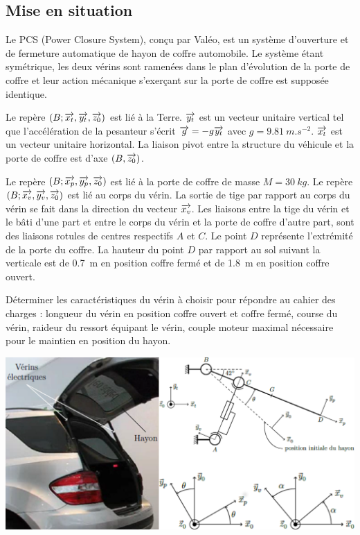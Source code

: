 \documentclass[10pt,fleqn]{article} %
\begin{document}

\vspace{4.5cm}
\pagestyle{fancy}
\thispagestyle{plain}


\def\columnseprulecolor{\color{ocre}}
\setlength{\columnseprule}{0.4pt} 

\ifprof
\begin{multicols}{2}
\else
\begin{multicols}{2}
\fi
\section*{Mise en situation}
Le PCS (Power Closure System), conçu par Valéo, est un système d’ouverture et de fermeture automatique de
hayon de coffre automobile.
Le système étant symétrique, les deux vérins sont ramenées dans 
le plan d’évolution de la porte de coffre et leur action mécanique s’exerçant sur la porte de coffre est supposée identique.

Le repère $\left(B;\overrightarrow{x_t},\overrightarrow{y_t},\overrightarrow{z_0} \right)$ est lié à la Terre. $\overrightarrow{y_t}$ est un vecteur unitaire vertical tel que l’accélération de la pesanteur s’écrit $\overrightarrow{g}=-g\overrightarrow{y_t}$ avec $g=\SI{9,81}{m.s^{-2}}$. $\overrightarrow{x_t}$ est un vecteur unitaire horizontal. La liaison pivot entre
la structure du véhicule et la porte de coffre est d’axe $\left(B,\overrightarrow{z_0}\right)$.

Le repère $\left(B;\overrightarrow{x_p},\overrightarrow{y_p},\overrightarrow{z_0} \right)$ est lié à la porte de coffre de masse $M=\SI{30}{kg}$. Le repère $\left(B;\overrightarrow{x_v},\overrightarrow{y_v},\overrightarrow{z_0} \right)$ est lié au corps du vérin. La sortie
de tige par rapport au corps du vérin se fait dans la direction du vecteur $\overrightarrow{x_v}$.
Les liaisons entre la tige du vérin et le bâti d’une part et entre le corps du vérin et la porte de coffre d’autre part, sont des liaisons rotules de centres respectifs $A$ et $C$.
Le point $D$ représente l’extrémité de la porte du coffre. La hauteur du point $D$ par rapport au sol suivant la
verticale est de \SI{0,7}{m} en position coffre fermé et de \SI{1,8}{m} en position coffre ouvert.

\begin{obj}
Déterminer les caractéristiques du vérin à choisir pour répondre au cahier des charges : longueur
du vérin en position coffre ouvert et coffre fermé, course du vérin, raideur du ressort équipant le
vérin, couple moteur maximal nécessaire pour le maintien en position du hayon.
\end{obj}

\begin{center}
\includegraphics[width=\linewidth]{images/fig_01}
\end{center}


\end{multicols}
\end{multicols}
\end{document}
